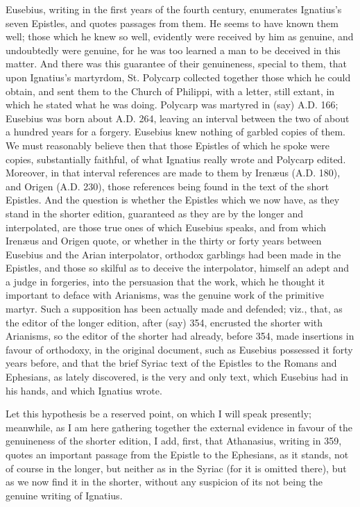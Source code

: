 Eusebius, writing in the first
years of the fourth century, enumerates Ignatius's seven Epistles, and
quotes passages from them. He seems to have known them well; those
which he knew so well, evidently were received by him as genuine, and
undoubtedly were genuine, for he was too learned a man to be deceived
in this matter. And there was this guarantee of their genuineness,
special to them, that upon Ignatius's martyrdom, St. Polycarp
collected together those which he could obtain, and sent them to the
Church of Philippi, with a letter, still extant, in which he stated
what he was doing. Polycarp was martyred in (say) A.D. 166; Eusebius
was born about A.D. 264, leaving an interval between the two
of about a hundred years for a forgery. Eusebius knew nothing of
garbled copies of them. We must reasonably believe then that those
Epistles of which he spoke were copies, substantially faithful, of
what Ignatius really wrote and Polycarp edited. Moreover, in
that interval references are made to them by Irenæus (A.D. 180), and Origen (A.D.
230), those references being found in the text of the short Epistles.
And the question is whether the Epistles which we now have, as they
stand in the shorter edition, guaranteed as they are by the longer and
interpolated, are those true ones of which Eusebius speaks, and from
which Irenæus and Origen quote, or whether in the thirty or forty
years between Eusebius and the Arian interpolator, orthodox garblings
had been made in the Epistles, and those so skilful as to deceive the
interpolator, himself an adept and a judge in forgeries, into the
persuasion that the work, which he thought it important to deface with
Arianisms, was the genuine work of the primitive martyr. Such a
supposition has been actually made and defended; viz., that, as the
editor of the longer edition, after (say) 354, encrusted the shorter
with Arianisms, so the editor of the shorter had already, before 354,
made insertions in favour of orthodoxy, in the original document, such
as Eusebius possessed it forty years before, and that the brief Syriac
text of the Epistles to the Romans and Ephesians, as lately
discovered, is the very and only text, which Eusebius had in his
hands, and which Ignatius wrote.

Let this hypothesis be a
reserved point, on which I will speak presently; meanwhile, as I am
here gathering together the external evidence in favour of the
genuineness of the shorter edition, I add, first, that Athanasius,
writing in 359, quotes an important passage from the Epistle to the
Ephesians, as it stands, not of course in the longer, but
neither as in the Syriac (for it is omitted there), but as we now find
it in the shorter, without any suspicion of its not being the genuine
writing of Ignatius.

